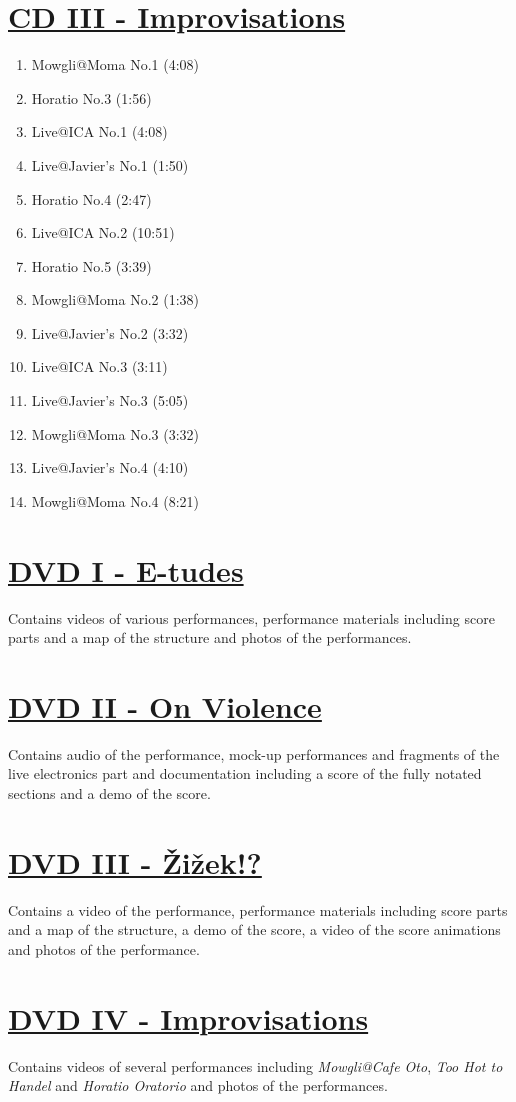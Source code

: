 \section*{\href{http://www.federicoreuben.com/phd/?page_id=162}{CD III - Improvisations}}

\begin{enumerate}
\item Mowgli@Moma No.1 (4:08)
\item Horatio No.3 (1:56)
\item Live@ICA No.1 (4:08)
\item Live@Javier's No.1 (1:50)
\item Horatio No.4 (2:47)
\item Live@ICA No.2 (10:51)
\item Horatio No.5 (3:39)
\item Mowgli@Moma No.2 (1:38)
\item Live@Javier's No.2 (3:32)
\item Live@ICA No.3 (3:11)
\item Live@Javier's No.3 (5:05)
\item Mowgli@Moma No.3 (3:32)
\item Live@Javier's No.4 (4:10)
\item Mowgli@Moma No.4 (8:21)
\end{enumerate}

\section*{\href{http://www.federicoreuben.com/phd/etudes}{DVD I - E-tudes}}

Contains videos of various performances, performance materials including score parts and a map of the structure and photos of the performances.

\section*{\href{http://www.federicoreuben.com/phd/onviolence}{DVD II - On Violence}}

Contains audio of the performance, mock-up performances and fragments of the live electronics part and documentation including a score of the fully notated sections and a demo of the score.

\section*{\href{http://www.federicoreuben.com/phd/zizek}{DVD III - \v{Z}i\v{z}ek!?}}

Contains a video of the performance, performance materials including score parts and a map of the structure, a demo of the score, a video of the score animations and photos of the performance.

\section*{\href{http://www.federicoreuben.com/phd/improvisations}{DVD IV - Improvisations}}

Contains videos of several performances including \emph{Mowgli@Cafe Oto}, \emph{Too Hot to Handel} and \emph{Horatio Oratorio} and photos of the performances.
